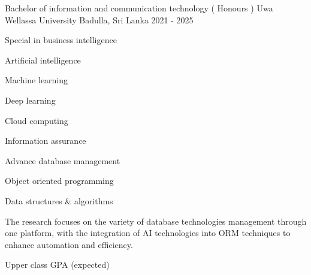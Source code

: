 

\begin{cventries}

  \cventry
    {Bachelor of information and communication technology ( Honours )} %
    {Uwa Wellassa University} %
    {Badulla, Sri Lanka} %
    {2021 - 2025} %
    {
      \begin{cvitems} %
        \item {Special in business intelligence }
        \item {Artificial intelligence}
        \item {Machine learning}
        \item {Deep learning}
        \item {Cloud computing}
        \item {Information assurance }
        \item {Advance database management}
        \item {Object oriented programming}
        \item {Data structures  \&  algorithms}
        \item {The research focuses on the variety of database technologies management through one platform, with the integration of AI technologies into ORM techniques to enhance automation and efficiency.}
        \item {Upper class GPA (expected)}
      \end{cvitems}
    }

\end{cventries}
